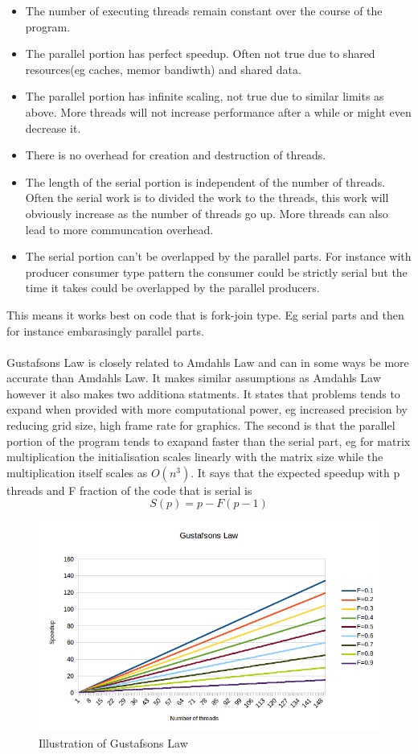 \documentclass[10pt,a4paper]{article}
\begin{document}
\begin{itemize}
  \item The number of executing threads remain constant over the course of the program.
  \item The parallel portion has perfect speedup. Often not true due to shared resources(eg caches, memor bandiwth) and shared data.
  \item The parallel portion has infinite scaling, not true due to similar limits as above. More threads will not increase performance after a while or might even decrease it.
  \item There is no overhead for creation and destruction of threads.
  \item The length of the serial portion is independent of the number of threads. Often the serial work is to divided the work to the threads, this work will obviously increase as the number of threads go up. More threads can also lead to more communcation overhead.
  \item The serial portion can't be overlapped by the parallel parts. For instance with producer consumer type pattern the consumer could be strictly serial but the time it takes could be overlapped by the parallel producers.
\end{itemize}

This means it works best on code that is fork-join type. Eg serial parts and then for instance embarasingly parallel parts.\\
\\
Gustafsons Law is closely related to Amdahls Law and can in some ways be more accurate than Amdahls Law. It makes similar assumptions as Amdahls Law however it also makes two additiona statments. It states that problems tends to expand when provided with more computational power, eg increased precision by reducing grid size, high frame rate for graphics. The second is that the parallel portion of the program tends to exapand faster than the serial part, eg for matrix multiplication the initialisation scales linearly with the matrix size while the multiplication itself scales as $O(n^3)$. It says that the expected speedup with p threads and F fraction of the code that is serial is\cite{gustafson1988reevaluating}
$$S(p)=p-F(p-1)$$

\begin{figure}[h]
    \centering
    \includegraphics[width=13cm]{GustafsonsLaw.png}
    \caption{Illustration of Gustafsons Law}
    \label{fig:GustafsonsLaw}
\end{figure}
\end{document}
